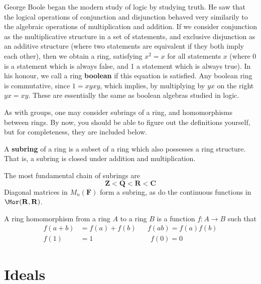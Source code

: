 \begin{example}
    George Boole began the modern study of logic by studying truth. He saw that the logical operations of conjunction and disjunction behaved very similarily to the algebraic operations of multiplication and addition. If we consider conjunction as the multiplicative structure in a set of statements, and exclusive disjunction as an additive structure (where two statements are equivalent if they both imply each other), then we obtain a ring, satisfying $x^2 = x$ for all statements $x$ (where 0 is a statement which is always false, and 1 a statement which is always true). In his honour, we call a ring {\bf boolean} if this equation is satisfied. Any boolean ring is commutative, since $1 = xyxy$, which implies, by multiplying by $yx$ on the right $yx = xy$. These are essentially the same as boolean algebras studied in logic.
\end{example}

As with groups, one may consider subrings of a ring, and homomorphisms between rings. By now, you should be able to figure out the definitions yourself, but for completeness, they are included below.

\begin{definition}
    A {\bf subring} of a ring is a subset of a ring which also possesses a ring structure. That is, a subring is closed under addition and multiplication.
\end{definition}

The most fundamental chain of subrings are
%
\[ \mathbf{Z} < \mathbf{Q} < \mathbf{R} < \mathbf{C} \]
%
Diagonal matrices in $M_n(\mathbf{F})$ form a subring, as do the continuous functions in $\Mor(\mathbf{R}, \mathbf{R})$.

\begin{definition}
    A ring homomorphism from a ring $A$ to a ring $B$ is a function $f:A \to B$ such that
    \begin{align*}
        f(a + b) &= f(a) + f(b) && f(ab) = f(a)f(b)\\
        f(1) &= 1 && \ \ f(0) = 0
    \end{align*}
\end{definition}





\section{Ideals}

